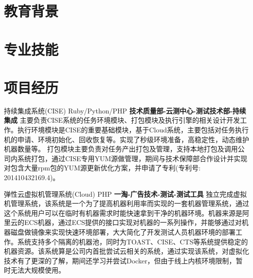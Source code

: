 \documentclass[11pt,a4paper,sans]{moderncv}   %
\title{}                     %
\begin{document}
\begin{CJK*}{UTF8}{gbsn}                       %
\maketitle


\section{教育背景}

\renewcommand{\baselinestretch}{1.2}
\section{专业技能}


\section{项目经历}

{持续集成系统(CISE)}
{Ruby/Python/PHP}
{}{\textbf{技术质量部-云测中心-测试技术部-持续集成}}
{主要负责CISE系统的任务环境模块、打包模块及执行引擎的相关设计开发工作。执行环境模块是CISE的重要基础模块，基于Cloud系统，主要包括对任务执行机的申请、环境初始化、回收恢复等。实现了秒级环境准备，高稳定性，动态维护机器数量等。
打包模块主要负责对任务产出打包及管理，支持本地打包及调用公司内系统打包，通过CISE专用YUM源做管理，期间与技术保障部合作设计并实现对包含大量rpm包的YUM源更新优化方案，并申请了专利(专利号: 201410432169.4)。}
\vspace*{0.2\baselineskip}

{弹性云虚拟机管理系统(Cloud)}
{PHP}
{}{\textbf{一淘-广告技术-测试-测试工具}}
{独立完成虚拟机管理系统，该系统是一个为了提高机器利用率而实现的一套机器管理系统，通过这个系统用户可以在临时有机器需求时能快速拿到干净的机器环境。机器来源是阿里云的ECS机器，通过ECS提供的接口实现对机器的一系列操作，并能够通过对机器磁盘做镜像来实现快速环境部署，大大简化了开发测试人员机器环境的部署工作。系统支持多个隔离的机器池，同时为TOAST、CISE、CTS等系统提供稳定的机器资源。该系统算是公司内首批尝试云相关的系统，通过实现该系统，对虚拟化技术有了更深的了解，期间还学习并尝试Docker，但由于线上内核环境限制，暂时无法大规模使用。}
\vspace*{0.2\baselineskip}


\end{CJK*}
\end{document}
